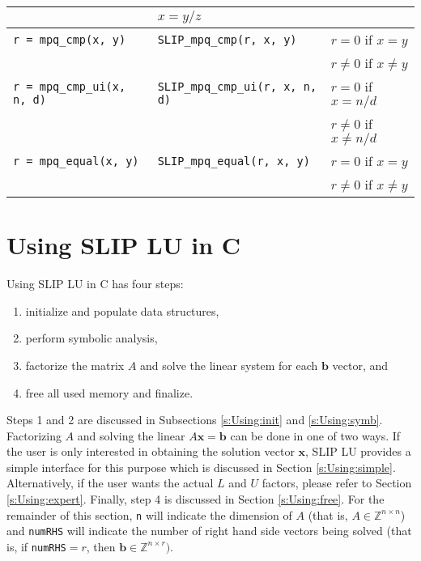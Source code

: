 \documentclass[12pt]{article}
\theoremstyle{definition}
\begin{document}
{\begin{center}
\begin{tabular}{|l|l|l|}
    & $x = y/z$ \\ \hline
\verb|r = mpq_cmp(x, y)|
    & \verb|SLIP_mpq_cmp(r, x, y)|
    & $r = 0$ if $x=y$\\&&  $r\neq 0$ if $x\neq y$ \\ \hline
\verb|r = mpq_cmp_ui(x, n, d)|
    & \verb|SLIP_mpq_cmp_ui(r, x, n, d)|
    & $r = 0$ if $x=n/d$\\&& $r\neq 0$ if $x\neq n/d$ \\ \hline
\verb|r = mpq_equal(x, y)|
    & \verb|SLIP_mpq_equal(r, x, y)|
    & $r = 0$ if $x=y$\\&&  $r\neq 0$ if $x\neq y$ \\ \hline
\end{tabular}
\end{center}
}

\cprotect\section{Using SLIP LU in C} \label{s:Using}

Using SLIP LU in C has four steps:

\begin{enumerate}
\item initialize and populate data structures,
\item perform symbolic analysis,
\item factorize the matrix $A$ and solve the linear
system for each $\mathbf{b}$ vector, and
\item free all used memory and finalize.
\end{enumerate}

Steps 1 and 2 are discussed in Subsections \ref{s:Using:init} and
\ref{s:Using:symb}. Factorizing $A$ and solving the linear $A \mathbf{x} =
\mathbf{b}$ can be done in one of two ways. If the user is only interested in
obtaining the solution vector $\mathbf{x}$, SLIP LU provides a simple interface
for this purpose which is discussed in Section \ref{s:Using:simple}.
Alternatively, if the user wants the actual $L$ and $U$ factors, please refer
to Section \ref{s:Using:expert}. Finally, step 4 is discussed in Section
\ref{s:Using:free}. For the remainder of this section, \verb|n| will indicate
the dimension of $A$ (that is, $A \in \mathbb{Z}^{n \times n}$) and
\verb|numRHS| will indicate the number of right hand side vectors being solved
(that is, if \verb|numRHS|$= r$, then $\mathbf{b} \in \mathbb{Z}^{n \times
r})$.
\end{document}
